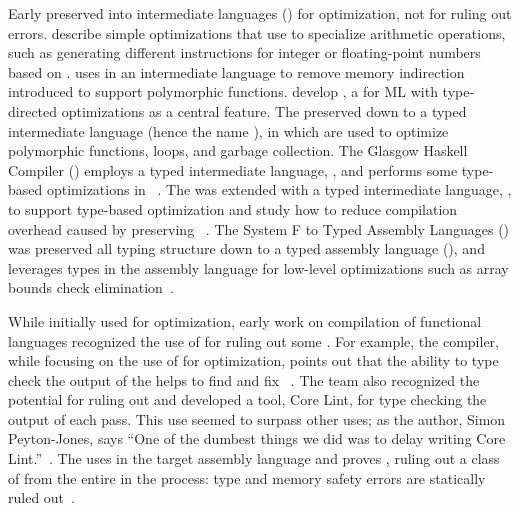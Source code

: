 Early  preserved  into intermediate languages
() for optimization, not for ruling out errors.
\citet[Chapter 10]{aho1986} describe simple optimizations that use 
to specialize arithmetic operations, such as generating different instructions
for integer or floating-point numbers based on .
\citet{leroy1992} uses  in an intermediate language to remove memory
indirection introduced to support polymorphic functions.
\citet{tarditi1996} develop , a  for ML with
type-directed optimizations as a central feature.
The   preserved  down to a typed
intermediate language (hence the name ), in which  are
used to optimize polymorphic functions, loops, and garbage collection.
The Glasgow Haskell Compiler () employs a typed intermediate
language, , and performs some type-based optimizations in
~\cite{peyton-jones1996}.
The   was extended with a typed intermediate
language, , to support type-based optimization and study how to
reduce compilation overhead caused by preserving ~\cite{shao1998}.
The System F to Typed Assembly Languages () 
was preserved all typing structure down to a typed assembly language
(), and leverages types in the assembly language for low-level
optimizations such as array bounds check elimination~\cite{morrisett1998:ftotal}.

While initially used for optimization, early work on 
compilation of functional languages recognized the use of  for
ruling out some .
For example, the  compiler, while focusing on the use of 
for optimization, points out that the ability to type check the output of the
 helps to find and fix ~\cite{tarditi1996}.
The  team also recognized the potential for ruling out
 and developed a tool, Core Lint, for type checking
the output of each  pass.
This use seemed to surpass other uses; as the author, Simon Peyton-Jones, says
``One of the dumbest things we did was to delay writing Core
Lint.''~\cite[section 8]{peyton-jones1996}.
The   uses  in the target assembly
language and proves , ruling out a class of
 from the entire  in the process:
type and memory safety errors are statically ruled out~\cite{morrisett1998:ftotal}.

